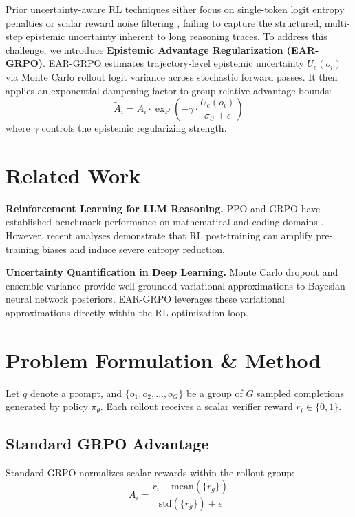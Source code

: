 \documentclass[11pt,a4paper]{article}
\begin{document}
Prior uncertainty-aware RL techniques either focus on single-token logit entropy penalties \cite{ucas2025} or scalar reward noise filtering \cite{krpo2026}, failing to capture the structured, multi-step epistemic uncertainty inherent to long reasoning traces. To address this challenge, we introduce \textbf{Epistemic Advantage Regularization (EAR-GRPO)}. EAR-GRPO estimates trajectory-level epistemic uncertainty $U_e(o_i)$ via Monte Carlo rollout logit variance across stochastic forward passes. It then applies an exponential dampening factor to group-relative advantage bounds:
\begin{equation}
\tilde{A}_i = A_i \cdot \exp\left( -\gamma \cdot \frac{U_e(o_i)}{\sigma_U + \epsilon} \right)
\end{equation}
where $\gamma$ controls the epistemic regularizing strength.

\section{Related Work}
\textbf{Reinforcement Learning for LLM Reasoning.} PPO and GRPO have established benchmark performance on mathematical and coding domains \cite{shao2024deepseekmath}. However, recent analyses demonstrate that RL post-training can amplify pre-training biases and induce severe entropy reduction.

\textbf{Uncertainty Quantification in Deep Learning.} Monte Carlo dropout and ensemble variance provide well-grounded variational approximations to Bayesian neural network posteriors. EAR-GRPO leverages these variational approximations directly within the RL optimization loop.

\section{Problem Formulation \& Method}
Let $q$ denote a prompt, and $\{o_1, o_2, \dots, o_G\}$ be a group of $G$ sampled completions generated by policy $\pi_\theta$. Each rollout receives a scalar verifier reward $r_i \in \{0, 1\}$.

\subsection{Standard GRPO Advantage}
Standard GRPO normalizes scalar rewards within the rollout group:
\begin{equation}
A_i = \frac{r_i - \text{mean}(\{r_g\})}{\text{std}(\{r_g\}) + \epsilon}
\end{equation}
\end{document}
